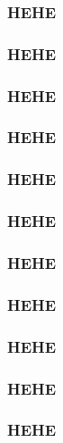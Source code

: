 \begin{frame}
  \frametitle{HEHE}
\end{frame}
\begin{frame}
  \frametitle{HEHE}
\end{frame}
\begin{frame}
  \frametitle{HEHE}
\end{frame}
\begin{frame}
  \frametitle{HEHE}
\end{frame}
\begin{frame}
  \frametitle{HEHE}
\end{frame}
\begin{frame}
  \frametitle{HEHE}
\end{frame}
\begin{frame}
  \frametitle{HEHE}
\end{frame}
\begin{frame}
  \frametitle{HEHE}
\end{frame}
\begin{frame}
  \frametitle{HEHE}
\end{frame}
\begin{frame}
  \frametitle{HEHE}
\end{frame}
\begin{frame}
  \frametitle{HEHE}
\end{frame}
